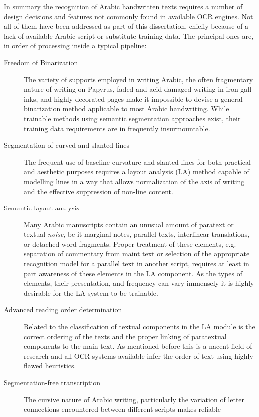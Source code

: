 In summary the recognition of Arabic handwritten texts requires a number of
design decisions and features not commonly found in available OCR engines. Not
all of them have been addressed as part of this dissertation, chiefly because
of a lack of available Arabic-script or substitute training data. The principal
ones are, in order of processing inside a typical pipeline:

\begin{description}
	\item[Freedom of Binarization] The variety of supports employed in
		writing Arabic, the often fragmentary nature of writing on
		Papyrus, faded and acid-damaged writing in iron-gall inks, and
		highly decorated pages make it impossible to devise a general
		binarization method applicable to most Arabic handwriting.
		While trainable methods using semantic segmentation approaches
		exist, their training data requirements are in frequently
		insurmountable.
	\item[Segmentation of curved and slanted lines] The frequent use of
		baseline curvature and slanted lines for both practical and
		aesthetic purposes requires a layout analysis (LA) method
		capable of modelling lines in a way that allows normalization
		of the axis of writing and the effective suppression of
		non-line content.
	\item[Semantic layout analysis] Many Arabic manuscripts contain an
		unusual amount of paratext or textual \emph{noise}, be it
		marginal notes, parallel texts, interlinear translations, or
		detached word fragments. Proper treatment of these elements,
		e.g. separation of commentary from maint text or selection of
		the appropriate recognition model for a parallel text in
		another script, requires at least in part awareness of these
		elements in the LA component. As the types of elements, their
		presentation, and frequency can vary immensely it is highly
		desirable for the LA system to be trainable.
	\item[Advanced reading order determination] Related to the
		classification of textual components in the LA module is the
		correct ordering of the texts and the proper linking of
		paratextual components to the main text. As mentioned before
		this is a nacent field of research and all OCR systems
		available infer the order of text using highly flawed
		heuristics.
	\item[Segmentation-free transcription] The cursive nature of Arabic
		writing, particularly the variation of letter connections
		encountered between different scripts makes reliable

\end{description}
